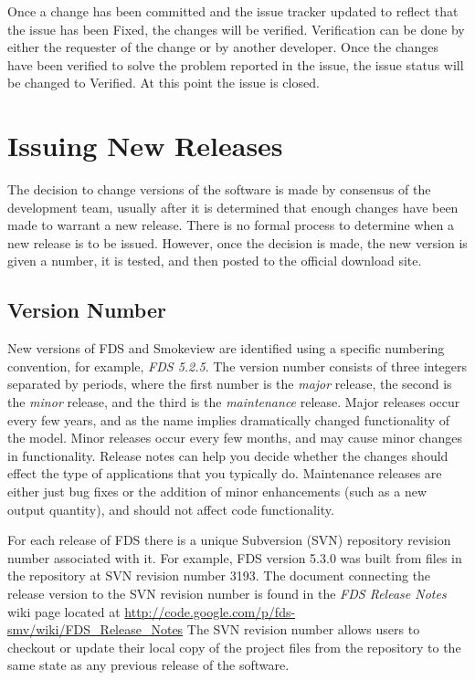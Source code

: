 \documentclass[11pt]{book}
\begin{document}
Once a change has been committed and the issue tracker updated to reflect that the issue has been {\ct Fixed},
the changes will be verified.  Verification can be done by either the requester of the change or by another
developer.  Once the changes have been verified to solve the problem reported in the issue, the issue status will
be changed to {\ct Verified}.  At this point the issue is closed.



\section{Issuing New Releases}

The decision to change versions of the software is made by consensus of the development team, usually after it is determined that enough
changes have been made to warrant a new release. There is no formal process to determine when a new release is to be issued. However, once the
decision is made, the new version is given a number, it is tested, and then posted to the official download site.

\subsection{Version Number}

New versions of FDS and Smokeview are identified using a specific numbering convention, for example, {\em FDS 5.2.5}.
The version number consists of three integers separated by periods, where the first number
is the {\em major} release, the second is the {\em minor} release, and the third is the {\em maintenance}
release.  Major releases occur every few years, and as the name implies dramatically changed functionality of the
model. Minor releases occur every few months, and may cause minor changes in functionality.
Release notes can help you decide whether the changes should effect the type of applications that you typically do.
Maintenance releases are either just bug fixes or the addition of minor enhancements (such as a new output quantity),
and should not affect code functionality.

For each release of FDS there is a unique Subversion (SVN) repository revision number associated with it.
For example, FDS version 5.3.0 was built from files in the repository at SVN revision number 3193.
The document connecting the release version to the SVN revision number is found in the {\em FDS Release Notes} wiki page
located at \href{http://code.google.com/p/fds-smv/wiki/FDS_Release_Notes}{{\ct http://code.google.com/p/fds-smv/wiki/FDS\_Release\_Notes}}
The SVN revision number allows users to checkout or update their local copy of the project files from the repository to the same state as any previous release of the software.
\end{document}
